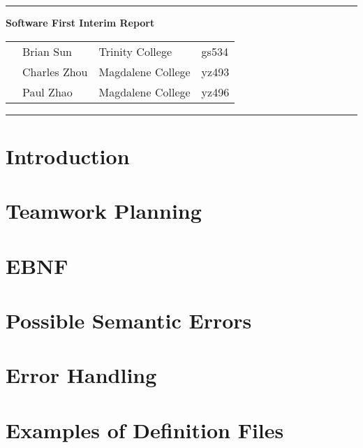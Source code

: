 \documentclass[12pt]{article}
\begin{document}
\vspace{0.3cm}
\rule{15.7cm}{0.5mm}


\begin{center}
{\hspace{0.6cm}\Large \textbf {Software First Interim Report}\\
}
\end{center}
\begin{table}[H]
\centering
\begin{tabular}{ p{1.5cm}p{5cm}p{6cm} p{6cm}} 
&Brian Sun & Trinity College & gs534 \\ 
&Charles Zhou & Magdalene College & yz493 \\ 
&Paul Zhao & Magdalene College & yz496 \\ 
\end{tabular}
\end{table}


\begin{center}
\rule{15.7cm}{0.5mm}
\end{center}

\section{Introduction}
\section{Teamwork Planning}
\section{EBNF}
\section{Possible Semantic Errors}
\section{Error Handling}
\section{Examples of Definition Files}
\end{document}
